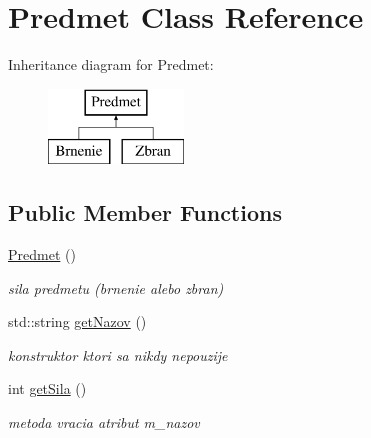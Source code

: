 \hypertarget{class_predmet}{\section{Predmet Class Reference}
\label{class_predmet}
}
Inheritance diagram for Predmet\-:\begin{figure}[H]
\begin{center}
\leavevmode
\includegraphics[height=2.000000cm]{class_predmet}
\end{center}
\end{figure}
\subsection*{Public Member Functions}
\begin{DoxyCompactItemize}
\item 
\hypertarget{class_predmet_ad4c245d0915fffcb7cd6e90073a2984b}{\hyperlink{class_predmet_ad4c245d0915fffcb7cd6e90073a2984b}{Predmet} ()}\label{class_predmet_ad4c245d0915fffcb7cd6e90073a2984b}

\begin{DoxyCompactList}\small\item\em sila predmetu (brnenie alebo zbran) \end{DoxyCompactList}\item 
\hypertarget{class_predmet_a416eba4ff016ba3bbeb32988e49492f7}{std\-::string \hyperlink{class_predmet_a416eba4ff016ba3bbeb32988e49492f7}{get\-Nazov} ()}\label{class_predmet_a416eba4ff016ba3bbeb32988e49492f7}

\begin{DoxyCompactList}\small\item\em konstruktor ktori sa nikdy nepouzije \end{DoxyCompactList}\item 
\hypertarget{class_predmet_a10937e2b58fbab9114ca6dbc03f2d4b7}{int \hyperlink{class_predmet_a10937e2b58fbab9114ca6dbc03f2d4b7}{get\-Sila} ()}\label{class_predmet_a10937e2b58fbab9114ca6dbc03f2d4b7}

\begin{DoxyCompactList}\small\item\em metoda vracia atribut m\-\_\-nazov \end{DoxyCompactList}\end{DoxyCompactItemize}
